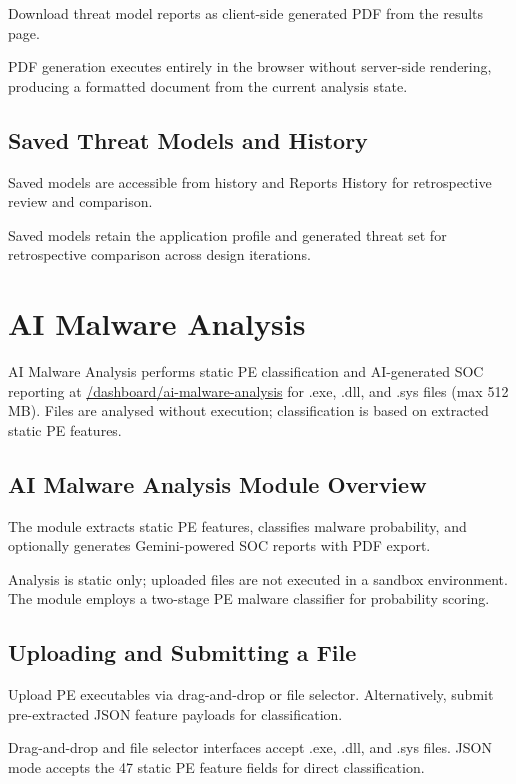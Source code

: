 Download threat model reports as client-side generated PDF from the results page.

PDF generation executes entirely in the browser without server-side rendering, producing a formatted document from the current analysis state.

\subsection{Saved Threat Models and History}

Saved models are accessible from history and Reports History for retrospective review and comparison.

Saved models retain the application profile and generated threat set for retrospective comparison across design iterations.

\section{AI Malware Analysis}

AI Malware Analysis performs static PE classification and AI-generated SOC reporting at \url{/dashboard/ai-malware-analysis} for .exe, .dll, and .sys files (max 512 MB). Files are analysed without execution; classification is based on extracted static PE features.

\subsection{AI Malware Analysis Module Overview}

The module extracts static PE features, classifies malware probability, and optionally generates Gemini-powered SOC reports with PDF export.

Analysis is static only; uploaded files are not executed in a sandbox environment. The module employs a two-stage PE malware classifier for probability scoring.

\subsection{Uploading and Submitting a File}

Upload PE executables via drag-and-drop or file selector. Alternatively, submit pre-extracted JSON feature payloads for classification.

Drag-and-drop and file selector interfaces accept .exe, .dll, and .sys files. JSON mode accepts the 47 static PE feature fields for direct classification.

